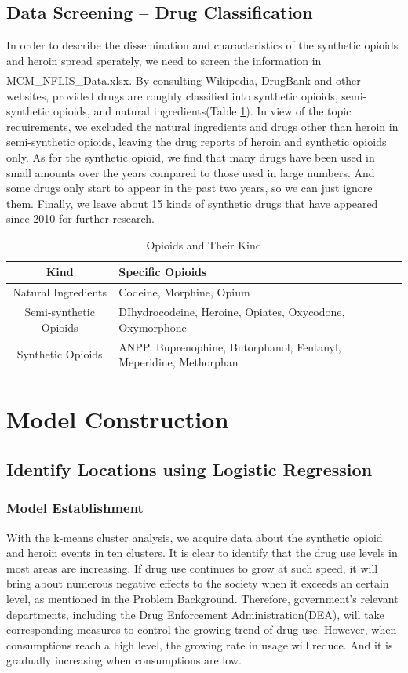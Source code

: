 \documentclass[12pt]{article}
\newcommand{\upcite}[1]{\textsuperscript{\textsuperscript{\cite{#1}}}}
\begin{document}
\subsection{Data Screening -- Drug Classification}
In order to describe the dissemination and characteristics of the synthetic opioids and heroin spread sperately, we need to screen the information in MCM\_NFLIS\_Data.xlsx. By consulting Wikipedia, DrugBank\upcite{4} and other websites, provided drugs are roughly classified into synthetic opioids, semi-synthetic opioids, and natural ingredients(Table \ref{opioid kind}). In view of the topic requirements, we excluded the natural ingredients and drugs other than heroin in semi-synthetic opioids, leaving the drug reports of heroin and synthetic opioids only. As for the synthetic opioid, we find that many drugs have been used in small amounts over the years compared to those used in large numbers. And some drugs only start to appear in the past two years, so we can just ignore them. Finally, we leave about 15 kinds of synthetic drugs that have appeared since 2010 for further research.
\begin{table}[H]
	\small
	\centering
	\caption{Opioids and Their Kind}
	\begin{tabular}{c|l}
	\hline
	Kind & Specific Opioids\\
	\hline
	Natural Ingredients	& Codeine, Morphine, Opium \\
	\hline
	Semi-synthetic Opioids & DIhydrocodeine, Heroine, Opiates, Oxycodone, Oxymorphone\\
	\hline
	Synthetic Opioids &  ANPP, Buprenophine, Butorphanol, Fentanyl, Meperidine, Methorphan\\
	\hline
	\end{tabular}
	\label{opioid kind}
\end{table}

\section{Model Construction}
\subsection{Identify Locations using Logistic Regression}
\subsubsection{Model Establishment}
With the k-means cluster analysis, we acquire data about the synthetic opioid and heroin events in ten clusters. It is clear to identify that the drug use levels in most areas are increasing. If drug use continues to grow at such speed, it will bring about numerous negative effects to the society when it exceeds an certain level, as mentioned in the Problem Background. Therefore, government’s relevant departments, including the Drug Enforcement Administration(DEA), will take corresponding measures to control the growing trend of drug use. However, when consumptions reach a high level, the growing rate in usage will reduce. And it is gradually increasing when consumptions are low.
\end{document}
